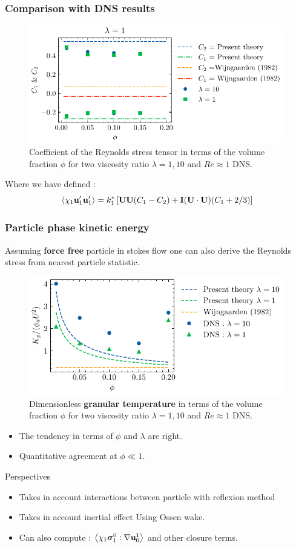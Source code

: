 \documentclass{sintefbeamer}
\begin{document}
\begin{frame}
  \frametitle{Comparison with DNS results }
  \begin{figure}[h!]
    \centering    
    \includegraphics[height = 0.25\textwidth]{image/HOMOGENEOUS/fCA/Pseudo_turbe_coef.pdf}
    \caption{
       Coefficient of the Reynolds stress tensor in terms of the volume fraction $\phi$ for two viscosity ratio $\lambda =1,10$ and $Re \approx 1$ DNS. 
    }
    \label{fig:Cp}
\end{figure}  
Where we have defined :
\begin{equation*}
  \left<\chi_1\textbf{u}_1'\textbf{u}_1'\right>
  = k^*_1 \left[
      \textbf{U}
      \textbf{U}
      (C_1  - C_2 )
      + \textbf{I} 
      (\textbf{U}\cdot\textbf{U})  (C_1+2/3) 
  \right]
\end{equation*}
\end{frame}


\begin{frame}
  \frametitle{Particle phase kinetic energy}
  Assuming \textbf{force free} particle in stokes flow one can also derive the Reynolds stress from nearest particle statistic. 
  \begin{figure}[h!]
    \centering    
    \includegraphics[height = 0.25\textwidth]{image/HOMOGENEOUS/fCA/Pseudo_turbeP.pdf}
    \caption{
       Dimensionless \textbf{granular temperature} in terms of the volume fraction $\phi$ for two viscosity ratio $\lambda =1,10$ and $Re \approx 1$ DNS. 
    }
    \label{fig:Cp}
\end{figure}  
\begin{itemize}
  \item The tendency in terms of $\phi$ and $\lambda$ are right.  
  \item Quantitative agreement at $\phi \ll 1$.  
\end{itemize}


\end{frame}
\begin{frame}
  {Perspectives}
  \begin{itemize}
    \item Takes in account interactions between particle with reflexion method 
    \item Takes in account inertial effect Using Ossen wake. 
    \item Can also compute : $\left<\chi_1 \bm{\sigma}_1^0 : \mathbf{\nabla}  \textbf{u}_0^1\right>$ and other closure terms. 
  \end{itemize}
\end{frame}
\end{document}
